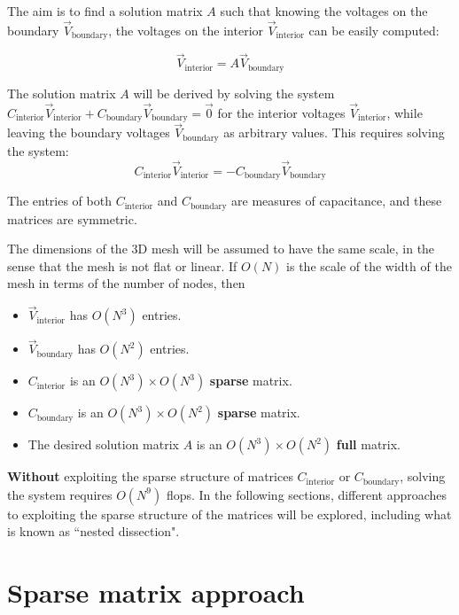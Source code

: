 \documentclass{article}
\begin{document}
The aim is to find a solution matrix \(A\) such that knowing the voltages on the boundary \(\vec{V}_{\text{boundary}}\), the voltages on the interior \(\vec{V}_{\text{interior}}\) can be easily computed:

\[\vec{V}_{\text{interior}} = A\vec{V}_{\text{boundary}}\]

The solution matrix \(A\) will be derived by solving the system \(C_{\text{interior}}\vec{V}_{\text{interior}} + C_{\text{boundary}}\vec{V}_{\text{boundary}} = \vec{0}\) for the interior voltages \(\vec{V}_{\text{interior}}\), while leaving the boundary voltages \(\vec{V}_{\text{boundary}}\) as arbitrary values. This requires solving the system:
\[C_{\text{interior}}\vec{V}_{\text{interior}} = -C_{\text{boundary}}\vec{V}_{\text{boundary}}\]

The entries of both \(C_{\text{interior}}\) and \(C_{\text{boundary}}\) are measures of capacitance, and these matrices are symmetric. 

The dimensions of the 3D mesh will be assumed to have the same scale, in the sense that the mesh is not flat or linear. If \(O(N)\) is the scale of the width of the mesh in terms of the number of nodes, then 
\begin{itemize}
\item \(\vec{V}_{\text{interior}}\) has \(O(N^3)\) entries.
\item \(\vec{V}_{\text{boundary}}\) has \(O(N^2)\) entries. 
\item \(C_{\text{interior}}\) is an \(O(N^3) \times O(N^3)\) {\bf sparse} matrix.
\item \(C_{\text{boundary}}\) is an \(O(N^3) \times O(N^2)\) {\bf sparse} matrix.
\item The desired solution matrix \(A\) is an \(O(N^3) \times O(N^2)\) {\bf full} matrix.
\end{itemize} 

{\bf Without} exploiting the sparse structure of matrices \(C_{\text{interior}}\) or \(C_{\text{boundary}}\), solving the system requires \(O(N^9)\) flops. In the following sections, different approaches to exploiting the sparse structure of the matrices will be explored, including what is known as ``nested dissection".





\section{Sparse matrix approach}
\end{document}
